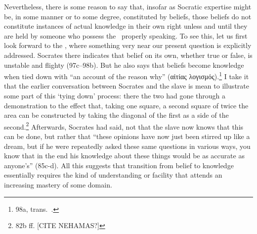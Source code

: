 \documentclass[11pt,letterpaper,oneside]{amsart} %
\begin{document}

Nevertheless, there is some reason to say that, insofar as Socratic expertise might be, in some manner or to some degree, constituted by beliefs, those beliefs do not constitute instances of actual knowledge in their own right unless and until they are held by someone who possess the \techne\ properly  speaking. To see this, let us first look forward to the , where something very near our present question is explicitly addressed. Socrates there indicates that belief on its own, whether true or false, is unstable and flighty (97c--98b). But he also says that beliefs become knowledge when tied down with ``an account of the reason why'' (αἰτίας λογισμός).\footnote{98a, trans.\ .} I take it that the earlier conversation between Socrates and the slave is mean to illustrate some part of this `tying down' process: there the two had gone through a demonstration to the effect that, taking one square, a second square of twice the area can be constructed by taking the diagonal of the first as a side of the second.\footnote{82b ff. [CITE NEHAMAS?]} Afterwards, Socrates had said, not that the slave now knows that this can be done, but rather that ``these opinions have now just been stirred up like a dream, but if he were repeatedly asked these same questions in various ways, you know that in the end his knowledge about these things would be as accurate as anyone's'' (85c-d). All this suggests that transition from belief to knowledge essentially requires the kind of understanding or facility that attends an increasing mastery of some domain.
\end{document}
